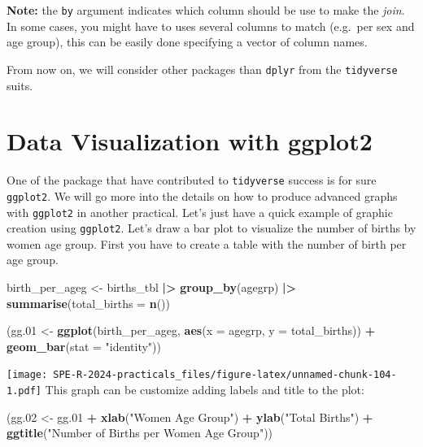 \documentclass[
]{book}
\newenvironment{Shaded}{\begin{snugshade}}{\end{snugshade}}
\newcommand{\AttributeTok}[1]{\textcolor[rgb]{0.13,0.29,0.53}{#1}}
\newcommand{\FloatTok}[1]{\textcolor[rgb]{0.00,0.00,0.81}{#1}}
\newcommand{\FunctionTok}[1]{\textcolor[rgb]{0.13,0.29,0.53}{\textbf{#1}}}
\newcommand{\NormalTok}[1]{#1}
\newcommand{\OtherTok}[1]{\textcolor[rgb]{0.56,0.35,0.01}{#1}}
\newcommand{\SpecialCharTok}[1]{\textcolor[rgb]{0.81,0.36,0.00}{\textbf{#1}}}
\newcommand{\StringTok}[1]{\textcolor[rgb]{0.31,0.60,0.02}{#1}}
\begin{document}
\textbf{Note:} the \texttt{by} argument indicates which column should be use to make the \emph{join}. In some
cases, you might have to uses several columns to match (e.g.~per sex and age group), this
can be easily done specifying a vector of column names.

From now on, we will consider other packages than \texttt{dplyr} from the \texttt{tidyverse} suits.

\section{Data Visualization with ggplot2}\label{data-visualization-with-ggplot2}

One of the package that have contributed to \texttt{tidyverse} success is for sure \texttt{ggplot2}.
We will go more into the details on how to produce advanced graphs with \texttt{ggplot2} in another practical.
Let's just have a quick example of graphic creation using \texttt{ggplot2}.
Let's draw a bar plot to visualize the number of births by women age group.
First you have to create a table with the number of birth per age group.

\begin{Shaded}
\begin{Highlighting}[]
\NormalTok{birth\_per\_ageg }\OtherTok{\textless{}{-}}\NormalTok{ births\_tbl }\SpecialCharTok{|\textgreater{}}
  \FunctionTok{group\_by}\NormalTok{(agegrp) }\SpecialCharTok{|\textgreater{}}
  \FunctionTok{summarise}\NormalTok{(}\AttributeTok{total\_births =} \FunctionTok{n}\NormalTok{())}
\end{Highlighting}
\end{Shaded}

\begin{Shaded}
\begin{Highlighting}[]
\NormalTok{(gg}\FloatTok{.01} \OtherTok{\textless{}{-}}
  \FunctionTok{ggplot}\NormalTok{(birth\_per\_ageg, }\FunctionTok{aes}\NormalTok{(}\AttributeTok{x =}\NormalTok{ agegrp, }\AttributeTok{y =}\NormalTok{ total\_births)) }\SpecialCharTok{+}
  \FunctionTok{geom\_bar}\NormalTok{(}\AttributeTok{stat =} \StringTok{"identity"}\NormalTok{))}
\end{Highlighting}
\end{Shaded}

\texttt{[image: SPE-R-2024-practicals\_files/figure-latex/unnamed-chunk-104-1.pdf]}
This graph can be customize adding labels and title to the plot:

\begin{Shaded}
\begin{Highlighting}[]
\NormalTok{(gg}\FloatTok{.02} \OtherTok{\textless{}{-}}
\NormalTok{  gg}\FloatTok{.01} \SpecialCharTok{+}
  \FunctionTok{xlab}\NormalTok{(}\StringTok{"Women Age Group"}\NormalTok{) }\SpecialCharTok{+}
  \FunctionTok{ylab}\NormalTok{(}\StringTok{"Total Births"}\NormalTok{) }\SpecialCharTok{+}
  \FunctionTok{ggtitle}\NormalTok{(}\StringTok{"Number of Births per Women Age Group"}\NormalTok{))}
\end{Highlighting}
\end{Shaded}
\end{document}
